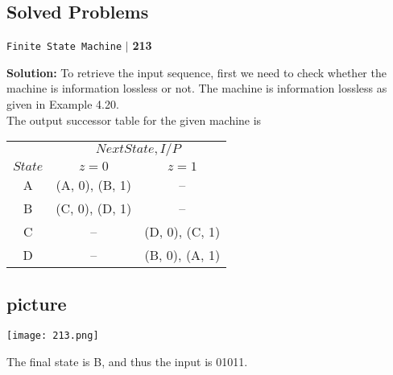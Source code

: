 \documentclass[8pt]{beamer}
\begin{document}
\begin{frame}
 \section*{Solved Problems}
\begin{flushright}
 \texttt{Finite State Machine} \hspace*{0.1cm}\textbf{$|$} \hspace*{0.1cm} \textbf{213}\hspace*{0.1cm}
\end{flushright}
\vspace*{0.5cm}

\textbf{Solution:} To retrieve the input sequence, first we need to check whether the machine is information
lossless or not. The machine is information lossless as given in Example 4.20.\\
\hspace*{0.5cm} The output successor table for the given machine is\\

\pause
\begin{center}
\begin{tabular}{ccc}
 \hline

 \hline

 \hline

 \hline
 & \multicolumn{2}{c}{$Next State, I/P$}\\
 \cline{2-3}
 $State$ &  $z=0$ & $z=1$\\
\hline
A   & (A, 0), (B, 1) &   –          \\
B   & (C, 0), (D, 1) &   –          \\
C   &  –             &(D, 0), (C, 1)\\
D   &  –             &(B, 0), (A, 1)\\
 \hline

 \hline

 \hline

 \hline
\end{tabular}
\end{center}
\end{frame}

\begin{frame}
\begin{center}
\section{picture}
\texttt{[image: 213.png]}
\end{center}

\hspace*{0.5cm} The final state is B, and thus the input is 01011.\\
\end{frame}
\end{document}

